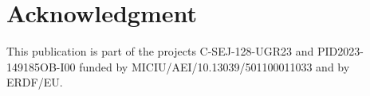 \documentclass[journal]{IEEEtran}
\begin{document}

\section*{Acknowledgment}

This publication is part of the projects C-SEJ-128-UGR23 and PID2023-149185OB-I00 funded by MICIU/AEI/10.13039/501100011033 and by ERDF/EU.


\ifCLASSOPTIONcaptionsoff
  \newpage
\fi








%

% 








\end{document}
